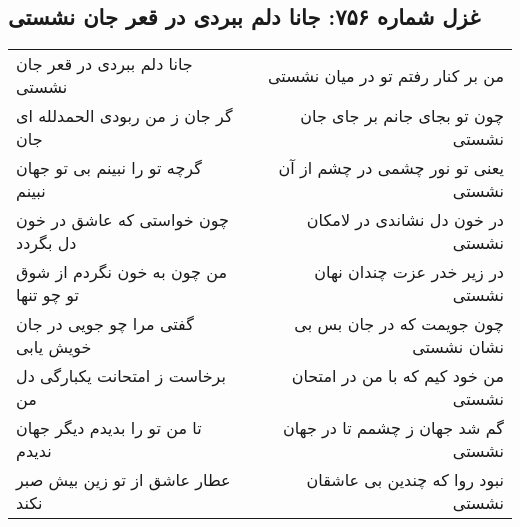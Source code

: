 \begin{center}
\section*{غزل شماره ۷۵۶: جانا دلم ببردی در قعر جان نشستی}
\label{sec:756}
\begin{longtable}{l p{0.5cm} r}
جانا دلم ببردی در قعر جان نشستی
&&
من بر کنار رفتم تو در میان نشستی
\\
گر جان ز من ربودی الحمدلله ای جان
&&
چون تو بجای جانم بر جای جان نشستی
\\
گرچه تو را نبینم بی تو جهان نبینم
&&
یعنی تو نور چشمی در چشم از آن نشستی
\\
چون خواستی که عاشق در خون دل بگردد
&&
در خون دل نشاندی در لامکان نشستی
\\
من چون به خون نگردم از شوق تو چو تنها
&&
در زیر خدر عزت چندان نهان نشستی
\\
گفتی مرا چو جویی در جان خویش یابی
&&
چون جویمت که در جان بس بی نشان نشستی
\\
برخاست ز امتحانت یکبارگی دل من
&&
من خود کیم که با من در امتحان نشستی
\\
تا من تو را بدیدم دیگر جهان ندیدم
&&
گم شد جهان ز چشمم تا در جهان نشستی
\\
عطار عاشق از تو زین بیش صبر نکند
&&
نبود روا که چندین بی عاشقان نشستی
\\
\end{longtable}
\end{center}
